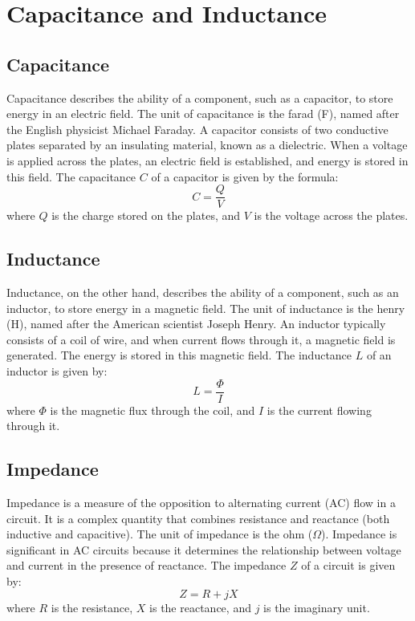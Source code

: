 \section{Capacitance and Inductance}
\label{section:capacitance_and_inductance}

\subsection*{Capacitance}
Capacitance describes the ability of a component, such as a capacitor, to store energy in an electric field. The unit of capacitance is the farad (F), named after the English physicist Michael Faraday. A capacitor consists of two conductive plates separated by an insulating material, known as a dielectric. When a voltage is applied across the plates, an electric field is established, and energy is stored in this field. The capacitance \( C \) of a capacitor is given by the formula:
\begin{equation}
    C = \frac{Q}{V}
\end{equation}
where \( Q \) is the charge stored on the plates, and \( V \) is the voltage across the plates.

\subsection*{Inductance}
Inductance, on the other hand, describes the ability of a component, such as an inductor, to store energy in a magnetic field. The unit of inductance is the henry (H), named after the American scientist Joseph Henry. An inductor typically consists of a coil of wire, and when current flows through it, a magnetic field is generated. The energy is stored in this magnetic field. The inductance \( L \) of an inductor is given by:
\begin{equation}
    L = \frac{\Phi}{I}
\end{equation}
where \( \Phi \) is the magnetic flux through the coil, and \( I \) is the current flowing through it.

\subsection*{Impedance}
Impedance is a measure of the opposition to alternating current (AC) flow in a circuit. It is a complex quantity that combines resistance and reactance (both inductive and capacitive). The unit of impedance is the ohm (\(\Omega\)). Impedance is significant in AC circuits because it determines the relationship between voltage and current in the presence of reactance. The impedance \( Z \) of a circuit is given by:
\begin{equation}
    Z = R + jX
\end{equation}
where \( R \) is the resistance, \( X \) is the reactance, and \( j \) is the imaginary unit.

